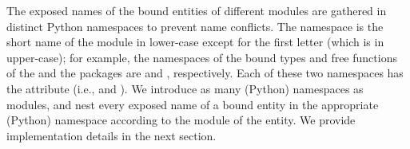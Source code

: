 \begin{table}[!htp]
  \caption{Module names and short names}
  \centering{}
  \label{tab:moduleName}
\end{table}

The exposed names of the bound entities of different modules are gathered in distinct Python namespaces to prevent name conflicts. The namespace is the short name of the module in lower-case except for the first letter (which is in upper-case); for example, the namespaces of the bound types and free functions of the \iiDandiiiDGeometryKernelPackage{} and the \iiDRegularizedBooleanSetOperationsPackage{} packages are  and , respectively.  Each of these two namespaces has the attribute  (i.e.,  and ). We introduce as many (Python) namespaces as modules, and nest every exposed name of a bound entity in the appropriate (Python) namespace according to the module of the entity. We provide implementation details in the next section.

